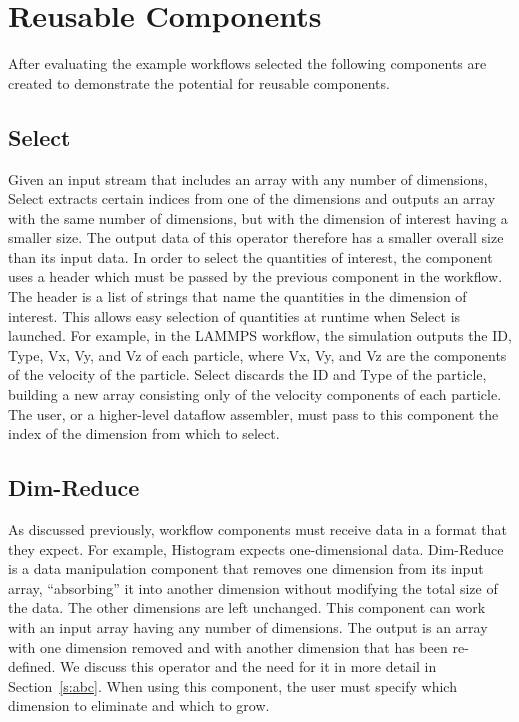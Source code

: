 \documentclass[conference]{IEEEtran}
\begin{document}
\section{Reusable Components}

After evaluating the example workflows selected the following components are
created to demonstrate the potential for reusable components.

\subsection{Select}

Given an input stream that includes an array with any number of dimensions,
Select extracts certain indices from one of the dimensions and outputs an array
with the same number of dimensions, but with the dimension of interest having a
smaller size. The output data of this operator therefore has a smaller overall
size than its input data. In order to select the quantities of interest, the
component uses a header which must be passed by the previous component in the
workflow. The header is a list of strings that name the quantities in the
dimension of interest. This allows easy selection of quantities at runtime when
Select is launched. For example, in the LAMMPS workflow, the simulation outputs
the ID, Type, Vx, Vy, and Vz of each particle, where Vx, Vy, and Vz are the
components of the velocity of the particle. Select discards the ID and Type of
the particle, building a new array consisting only of the velocity components
of each particle. The user, or a higher-level dataflow assembler, must pass to
this component the index of the dimension from which to select.

\subsection{Dim-Reduce}

As discussed previously, workflow components must receive data in a format
that they expect. For example, Histogram expects one-dimensional data.
Dim-Reduce is a data manipulation component that removes one dimension from its
input array, ``absorbing'' it into another dimension without modifying the
total size of the data. The other dimensions are left unchanged. This component
can work with an input array having any number of dimensions. The output is an
array with one dimension removed and with another dimension that has been
re-defined. We discuss this operator and the need for it in more detail in
Section~\ref{s:abc}. When using this component, the user must specify which
dimension to eliminate and which to grow.
\end{document}
